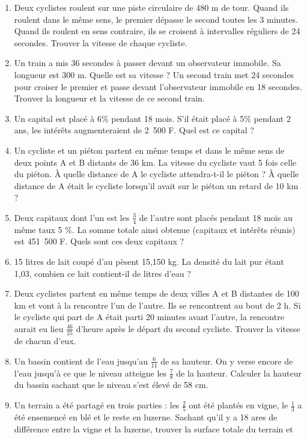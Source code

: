 \documentclass[12 pt]{report}
\theoremstyle{plain}
\newcounter{n}
\begin{document}
\begin{enumerate}
 \item Deux cyclistes roulent sur une piste circulaire de 480 m de tour. Quand ils roulent dans le même sens, le premier dépasse le 
 second toutes les 3 minutes. Quand ils roulent en sens contraire, ils se croisent à intervalles réguliers de 24 secondes. Trouver la 
 vitesse de chaque cycliste. 
 \item Un train a mis 36 secondes à passer devant un observateur immobile. Sa longueur est 300 m. Quelle est sa vitesse ? Un second 
 train met 24 secondes pour croiser le premier et passe devant l'observateur immobile en 18 secondes. Trouver la longueur et la 
 vitesse de ce second train. 
 \item Un capital est placé à 6\% pendant 18 mois. S'il était placé à 5\% pendant 2 ans, les intérêts augmenteraient de 2~500 F. Quel 
 est ce capital ?
 \item Un cycliste et un piéton partent en même temps et dans le même sens de deux points A et B distants de 36 km. La vitesse du cycliste vaut 5 fois celle du piéton. À quelle distance de A le cycliste attendra-t-il le piéton ? À quelle distance de A était le cycliste lorsqu'il avait sur le piéton un retard de 10 km ?  
 \item Deux capitaux dont l'un est les $\frac34$ de l'autre sont placés pendant 18 mois au même taux 5 \%. La somme totale ainsi obtenue (capitaux et intérêts réunis) est 451~500 F. Quels sont ces deux capitaux ? 
 \item 15 litres de lait coupé d'au pèsent 15,150 kg. La densité du lait pur étant 1,03, combien ce lait contient-il de litres d'eau ? 
 \item Deux cyclistes partent en même temps de deux villes A et B distantes de 100 km et vont à la rencontre l'un de l'autre. Ils 
 se rencontrent au bout de 2 h. Si le cycliste qui part de A était parti 20 minutes avant l'autre, la rencontre aurait eu lieu
 $\frac{46}{25}$ d'heure après le départ du second cycliste. Trouver la vitesse de chacun d'eux. 
 \item Un bassin contient de l'eau jusqu'au $\frac6{11}$ de sa hauteur. On y verse encore de l'eau jusqu'à ce que le niveau atteigne les $\frac78$ de la hauteur. Calculer la hauteur du bassin sachant que le niveau s'est élevé de 58 cm.
 \item Un terrain a été partagé en trois parties : les $\frac25$ ont été plantés en vigne, le $\frac13$ a été ensemencé en blé et le reste en luzerne. Sachant qu'il y a 18 ares de différence entre la vigne et la luzerne, trouver la surface totale du terrain et

\end{enumerate}
\end{document}
